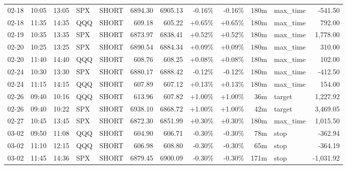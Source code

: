 \documentclass[11pt,a4paper,twoside]{article}
\begin{document}
\begin{center}
\begin{longtable}{>{\color{txtmain}}l l l l l r r r r r >{\color{txtmain}}l r}
02-18 & 10:05 & 13:05 & SPX & SHORT & 6894.30 & 6905.13 & \textcolor{lossred}{-0.16\%} & \textcolor{lossred}{-0.16\%} & 180m & max\_time & \textcolor{lossred}{-541.50} \\
02-18 & 11:35 & 14:35 & QQQ & SHORT & 609.18 & 605.22 & \textcolor{wingreen}{+0.65\%} & \textcolor{wingreen}{+0.65\%} & 180m & max\_time & \textcolor{wingreen}{792.00} \\
02-19 & 10:35 & 13:35 & SPX & SHORT & 6873.97 & 6838.41 & \textcolor{wingreen}{+0.52\%} & \textcolor{wingreen}{+0.52\%} & 180m & max\_time & \textcolor{wingreen}{1,778.00} \\
02-20 & 10:25 & 13:25 & SPX & SHORT & 6890.54 & 6884.34 & \textcolor{wingreen}{+0.09\%} & \textcolor{wingreen}{+0.09\%} & 180m & max\_time & \textcolor{wingreen}{310.00} \\
02-20 & 11:40 & 14:40 & QQQ & SHORT & 608.76 & 608.25 & \textcolor{wingreen}{+0.08\%} & \textcolor{wingreen}{+0.08\%} & 180m & max\_time & \textcolor{wingreen}{102.00} \\
02-24 & 10:30 & 13:30 & SPX & SHORT & 6880.17 & 6888.42 & \textcolor{lossred}{-0.12\%} & \textcolor{lossred}{-0.12\%} & 180m & max\_time & \textcolor{lossred}{-412.50} \\
02-24 & 11:15 & 14:15 & QQQ & SHORT & 607.89 & 607.12 & \textcolor{wingreen}{+0.13\%} & \textcolor{wingreen}{+0.13\%} & 180m & max\_time & \textcolor{wingreen}{154.00} \\
02-26 & 09:40 & 10:16 & QQQ & SHORT & 613.96 & 607.82 & \textcolor{wingreen}{+1.00\%} & \textcolor{wingreen}{+1.00\%} & 36m & target & \textcolor{wingreen}{1,227.92} \\
02-26 & 09:40 & 10:22 & SPX & SHORT & 6938.10 & 6868.72 & \textcolor{wingreen}{+1.00\%} & \textcolor{wingreen}{+1.00\%} & 42m & target & \textcolor{wingreen}{3,469.05} \\
02-27 & 10:45 & 13:45 & SPX & SHORT & 6872.30 & 6851.99 & \textcolor{wingreen}{+0.30\%} & \textcolor{wingreen}{+0.30\%} & 180m & max\_time & \textcolor{wingreen}{1,015.50} \\
03-02 & 09:50 & 11:08 & QQQ & SHORT & 604.90 & 606.71 & \textcolor{lossred}{-0.30\%} & \textcolor{lossred}{-0.30\%} & 78m & stop & \textcolor{lossred}{-362.94} \\
03-02 & 11:10 & 12:15 & QQQ & SHORT & 606.98 & 608.80 & \textcolor{lossred}{-0.30\%} & \textcolor{lossred}{-0.30\%} & 65m & stop & \textcolor{lossred}{-364.19} \\
03-02 & 11:45 & 14:36 & SPX & SHORT & 6879.45 & 6900.09 & \textcolor{lossred}{-0.30\%} & \textcolor{lossred}{-0.30\%} & 171m & stop & \textcolor{lossred}{-1,031.92} \\

\end{longtable}
\end{center}
\end{document}
